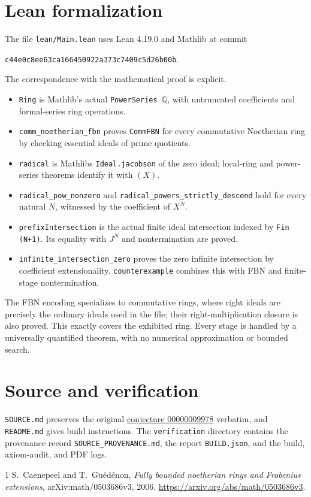 \documentclass[11pt]{article}
\newcommand{\Q}{\mathbb Q}
\begin{document}
\section*{Lean formalization}
The file \texttt{lean/Main.lean} uses Lean 4.19.0 and Mathlib at commit
\begin{center}\small\texttt{c44e0c8ee63ca166450922a373c7409c5d26b00b}.\end{center}
The correspondence with the mathematical proof is explicit.
\begin{itemize}
\item \texttt{Ring} is Mathlib's actual \texttt{PowerSeries $\Q$}, with untruncated coefficients and formal-series ring operations.
\item \texttt{comm\_noetherian\_fbn} proves \texttt{CommFBN} for every commutative Noetherian ring by checking essential ideals of prime quotients.
\item \texttt{radical} is Mathlib\textquotesingle s \texttt{Ideal.jacobson} of the zero ideal; local-ring and power-series theorems identify it with $(X)$.
\item \texttt{radical\_pow\_nonzero} and \texttt{radical\_powers\_strictly\_descend} hold for every natural $N$, witnessed by the coefficient of $X^N$.
\item \texttt{prefixIntersection} is the actual finite ideal intersection indexed by \texttt{Fin (N+1)}. Its equality with $J^N$ and nontermination are proved.
\item \texttt{infinite\_intersection\_zero} proves the zero infinite intersection by coefficient extensionality. \texttt{counterexample} combines this with FBN and finite-stage nontermination.
\end{itemize}
The FBN encoding specializes to commutative rings, where right ideals are precisely the ordinary ideals used in the file; their right-multiplication closure is also proved. This exactly covers the exhibited ring. Every stage is handled by a universally quantified theorem, with no numerical approximation or bounded search.

\section*{Source and verification}
\begin{flushleft}
\texttt{SOURCE.md} preserves the original
\href{https://github.com/The-Last-Math-Competition/The-Last-Math-Competition/blob/main/conjectures/00000009978.md}{conjecture 00000009978} verbatim, and \texttt{README.md} gives build instructions.
The \texttt{verification} directory contains the provenance record
\texttt{SOURCE\_PROVENANCE.md}, the report \texttt{BUILD.json}, and the build, axiom-audit, and PDF logs.
\end{flushleft}

\begin{thebibliography}{1}
 S.~Caenepeel and T.~Gu\'ed\'enon,
\emph{Fully bounded noetherian rings and Frobenius extensions},
arXiv:math/0503686v3, 2006.
\url{https://arxiv.org/abs/math/0503686v3}.
\end{thebibliography}
\end{document}
